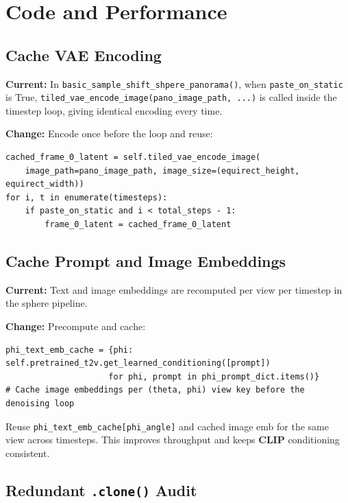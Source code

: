 \documentclass[11pt,a4paper]{article}
\newcommand{\fn}[1]{\texttt{#1}}
\begin{document}
\section{Code and Performance}

\subsection{Cache VAE Encoding}

\textbf{Current:} In \fn{basic\_sample\_shift\_shpere\_panorama()}, when \fn{paste\_on_static} is True, \fn{tiled\_vae\_encode\_image(pano\_image\_path, ...)} is called inside the timestep loop, giving identical encoding every time.

\textbf{Change:} Encode once before the loop and reuse:
\begin{lstlisting}
cached_frame_0_latent = self.tiled_vae_encode_image(
    image_path=pano_image_path, image_size=(equirect_height, equirect_width))
for i, t in enumerate(timesteps):
    if paste_on_static and i < total_steps - 1:
        frame_0_latent = cached_frame_0_latent
\end{lstlisting}

\subsection{Cache Prompt and Image Embeddings}

\textbf{Current:} Text and image embeddings are recomputed per view per timestep in the sphere pipeline.

\textbf{Change:} Precompute and cache:
\begin{lstlisting}
phi_text_emb_cache = {phi: self.pretrained_t2v.get_learned_conditioning([prompt])
                     for phi, prompt in phi_prompt_dict.items()}
# Cache image embeddings per (theta, phi) view key before the denoising loop
\end{lstlisting}
Reuse \fn{phi\_text\_emb\_cache[phi\_angle]} and cached image emb for the same view across timesteps. This improves throughput and keeps \textbf{CLIP} conditioning consistent.

\subsection{Redundant \fn{.clone()} Audit}
\end{document}
